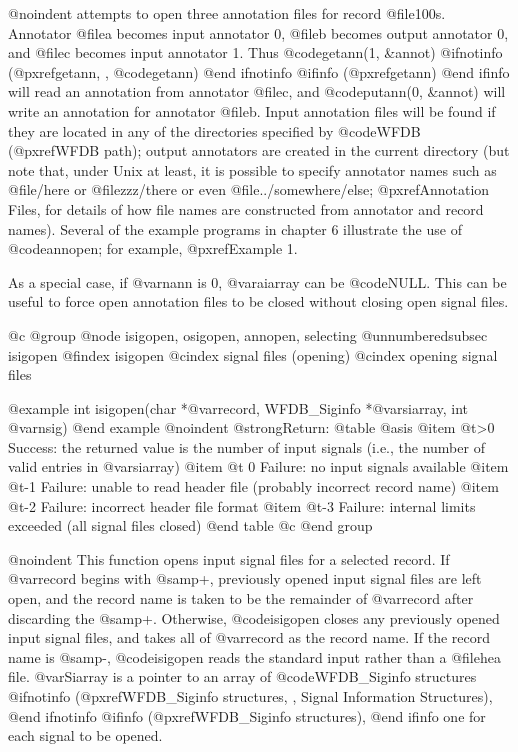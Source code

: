 {{{{{{{{@noindent
attempts to open three annotation files for record @file{100s}.
Annotator @file{a} becomes input annotator 0, @file{b} becomes output
annotator 0, and @file{c} becomes input annotator 1.  Thus
@code{getann(1, &annot)}
@ifnotinfo
(@pxref{getann, , @code{getann}})
@end ifnotinfo
@ifinfo
(@pxref{getann})
@end ifinfo
will read an annotation from annotator @file{c}, and
@code{putann(0, &annot)} will write an annotation for annotator @file{b}.
Input annotation files will be found if they are located in any of the
directories specified by @code{WFDB} (@pxref{WFDB path}); output annotators
are created in the current directory (but note that, under Unix at
least, it is possible to specify annotator names such as @file{/here} or
@file{zzz/there} or even @file{../somewhere/else}; @pxref{Annotation
Files}, for details of how file names are constructed from annotator and
record names).  Several of the example programs in chapter 6 illustrate
the use of @code{annopen}; for example, @pxref{Example 1}.

As a special case, if @var{nann} is 0, @var{aiarray} can be @code{NULL}.
This can be useful to force open annotation files to be closed without
closing open signal files.

@c @group
@node     isigopen, osigopen, annopen, selecting
@unnumberedsubsec isigopen
@findex isigopen
@cindex signal files (opening)
@cindex opening signal files

@example
int isigopen(char *@var{record}, WFDB_Siginfo *@var{siarray}, int @var{nsig})
@end example
@noindent
@strong{Return:}
@table @asis
@item @t{>0}
Success: the returned value is the number of input signals (i.e., the
number of valid entries in @var{siarray})
@item @t{ 0}
Failure: no input signals available
@item @t{-1}
Failure: unable to read header file (probably incorrect record name)
@item @t{-2}
Failure: incorrect header file format
@item @t{-3}
Failure: internal limits exceeded (all signal files closed)
@end table
@c @end group

@noindent
This function opens input signal files for a selected record.  If
@var{record} begins with @samp{+}, previously opened input signal files
are left open, and the record name is taken to be the remainder of
@var{record} after discarding the @samp{+}.  Otherwise, @code{isigopen}
closes any previously opened input signal files, and takes all of
@var{record} as the record name.  If the record name is @samp{-},
@code{isigopen} reads the standard input rather than a @file{hea}
file.  @var{Siarray} is a pointer to an array of @code{WFDB_Siginfo}
structures
@ifnotinfo
(@pxref{WFDB_Siginfo structures, , Signal Information Structures}),
@end ifnotinfo
@ifinfo
(@pxref{WFDB_Siginfo structures}),
@end ifinfo
one for each signal to be opened.

}}}}}}}}
